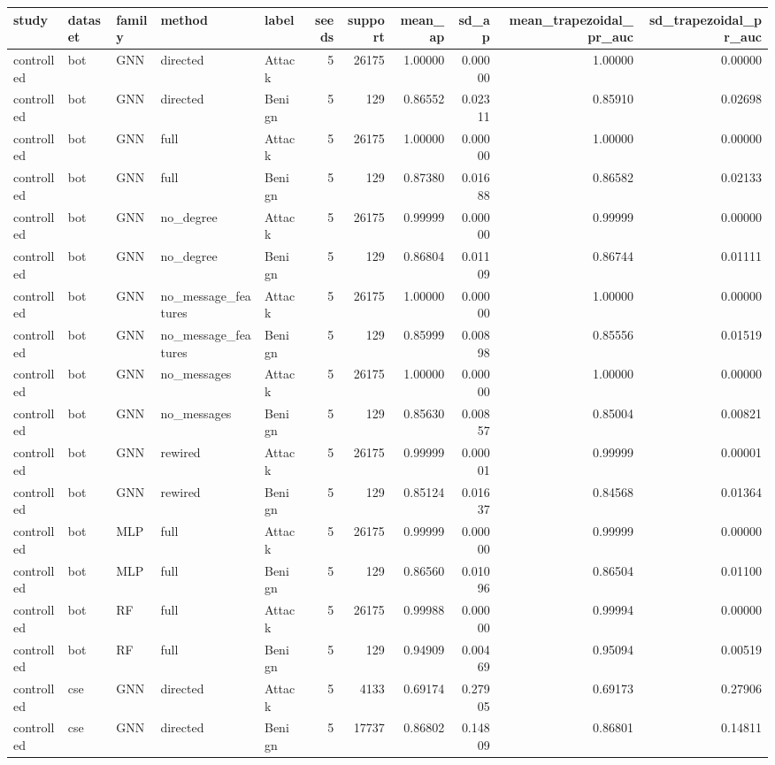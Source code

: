 \begin{tabular}{lllllrrrrrr}
\toprule
study & dataset & family & method & label & seeds & support & mean_ap & sd_ap & mean_trapezoidal_pr_auc & sd_trapezoidal_pr_auc \\
\midrule
controlled & bot & GNN & directed & Attack & 5 & 26175 & 1.00000 & 0.00000 & 1.00000 & 0.00000 \\
controlled & bot & GNN & directed & Benign & 5 & 129 & 0.86552 & 0.02311 & 0.85910 & 0.02698 \\
controlled & bot & GNN & full & Attack & 5 & 26175 & 1.00000 & 0.00000 & 1.00000 & 0.00000 \\
controlled & bot & GNN & full & Benign & 5 & 129 & 0.87380 & 0.01688 & 0.86582 & 0.02133 \\
controlled & bot & GNN & no_degree & Attack & 5 & 26175 & 0.99999 & 0.00000 & 0.99999 & 0.00000 \\
controlled & bot & GNN & no_degree & Benign & 5 & 129 & 0.86804 & 0.01109 & 0.86744 & 0.01111 \\
controlled & bot & GNN & no_message_features & Attack & 5 & 26175 & 1.00000 & 0.00000 & 1.00000 & 0.00000 \\
controlled & bot & GNN & no_message_features & Benign & 5 & 129 & 0.85999 & 0.00898 & 0.85556 & 0.01519 \\
controlled & bot & GNN & no_messages & Attack & 5 & 26175 & 1.00000 & 0.00000 & 1.00000 & 0.00000 \\
controlled & bot & GNN & no_messages & Benign & 5 & 129 & 0.85630 & 0.00857 & 0.85004 & 0.00821 \\
controlled & bot & GNN & rewired & Attack & 5 & 26175 & 0.99999 & 0.00001 & 0.99999 & 0.00001 \\
controlled & bot & GNN & rewired & Benign & 5 & 129 & 0.85124 & 0.01637 & 0.84568 & 0.01364 \\
controlled & bot & MLP & full & Attack & 5 & 26175 & 0.99999 & 0.00000 & 0.99999 & 0.00000 \\
controlled & bot & MLP & full & Benign & 5 & 129 & 0.86560 & 0.01096 & 0.86504 & 0.01100 \\
controlled & bot & RF & full & Attack & 5 & 26175 & 0.99988 & 0.00000 & 0.99994 & 0.00000 \\
controlled & bot & RF & full & Benign & 5 & 129 & 0.94909 & 0.00469 & 0.95094 & 0.00519 \\
controlled & cse & GNN & directed & Attack & 5 & 4133 & 0.69174 & 0.27905 & 0.69173 & 0.27906 \\
controlled & cse & GNN & directed & Benign & 5 & 17737 & 0.86802 & 0.14809 & 0.86801 & 0.14811 \\

\end{tabular}
